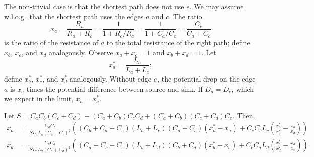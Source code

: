 \documentclass[11pt,a4paper]{article}
\begin{document}
The non-trivial case is that the shortest path does not use $e$. We may assume
w.l.o.g.~that the shortest path uses the edges $a$ and $c$. The ratio
\[   x_a = \frac{R_a}{R_a + R_c} = \frac{1}{1 + R_c/R_a} =
\frac{1}{1 + C_a/C_c} = \frac{C_c}{C_a + C_c}\]
is the ratio of the resistance of $a$ to the total resistance of the right
path; define $x_b$, $x_c$, and
$x_d$ analogously. Observe $x_a + x_c = 1$ and $x_b + x_d = 1$. 
Let 
\[    x_a^* = \frac{L_a}{L_a + L_c}; \]
define $x_b^*$, $x_c^*$, and $x_d^*$ analogously. Without edge $e$, the
potential drop on the edge $a$ is $x_a$ times the potential difference between
source and sink. If $D_a = D_c$, which we expect in the limit, $x_a =
x_a^*$. 


\begin{lemma} Let $S = C_aC_b(C_c + C_d) + (C_a+ C_b)C_cC_d + (C_a + C_b)(C_c +
C_d)C_e$. Then, 
\begin{align*}
\dot{x_a} &=  \frac{C_a C_c }{S L_a L_c (C_a + C_c)^2} \left( (C_b + C_d +C_ e)(L_a +
L_c)(C_a + C_c)(x^*_a - x_a) + 
  C_e C_b L_c  \left( \frac{x_a^*}{x_c^*} - \frac{x_b}{x_d}
\right)\right)\\
\dot{x_b} &=  \frac{C_b C_d }{S L_b L_d (C_b + C_d)^2} \left( (C_a + C_c + C_e)(L_b +
L_d)(C_b + C_d)(x^*_b - x_b) + 
  C_e C_a L_d  \left( \frac{x_b^*}{x_d^*} - \frac{x_a}{x_c}
\right)\right).  \end{align*}     
\end{lemma}
\end{document}
